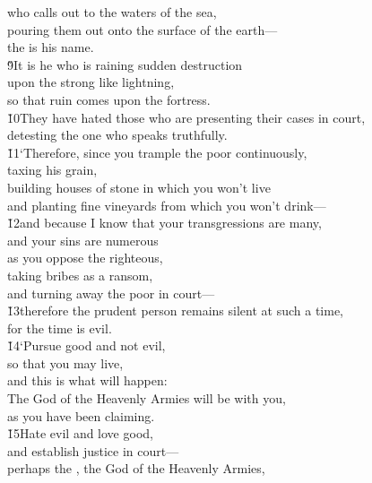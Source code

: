 \begin{poetry}
\poemll    who calls out to the waters of the sea, \\
\poemlll       pouring them out onto the surface of the earth--- \\
\poemll    the  is his name. \\
\poeml \v{9}It is he who is raining sudden destruction \\
\poemll    upon the strong like lightning, \\
\poemlll       so that ruin comes upon the fortress. \\
\poeml \v{10}They have hated those who are presenting their cases in court, \\
\poemll    detesting the one who speaks truthfully. \\
\poeml \v{11}`Therefore, since you trample the poor continuously, \\
\poemll    taxing his grain, \\
\poemll    building houses of stone in which you won't live \\
\poemll    and planting fine vineyards from which you won't drink--- \\
\poeml \v{12}and because I know that your transgressions are many, \\
\poemll    and your sins are numerous \\
\poeml as you oppose the righteous, \\
\poemll    taking bribes as a ransom, \\
\poemlll       and turning away the poor in court--- \\
\poeml \v{13}therefore the prudent person remains silent at such a time, \\
\poemll    for the time is evil. \\
\poeml \v{14}`Pursue good and not evil, \\
\poemll    so that you may live, \\
\poeml and this is what will happen: \\
\poemll    The  God of the Heavenly Armies will be with you, \\
\poemlll       as you have been claiming. \\
\poeml \v{15}Hate evil and love good, \\
\poemll    and establish justice in court--- \\
\poeml perhaps the , the God of the Heavenly Armies, \\

\end{poetry}
